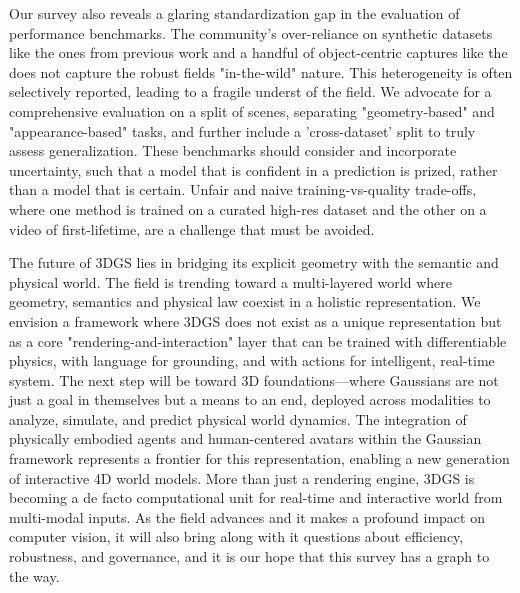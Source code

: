 \documentclass[11pt,a4paper]{article}
\begin{document}
Our survey also reveals a glaring standardization gap in the evaluation of performance benchmarks. The community's over-reliance on synthetic datasets like the ones from previous work \cite{arxiv:2112.05131v1,arxiv:2103.14024v2} and a handful of object-centric captures like the \cite{arxiv:2112.05131v1} does not capture the robust fields "in-the-wild" nature. This heterogeneity is often selectively reported, leading to a fragile underst of the field. We advocate for a comprehensive evaluation on a split of scenes, separating "geometry-based" and "appearance-based" tasks, and further include a 'cross-dataset' split to truly assess generalization. These benchmarks should consider and incorporate uncertainty, such that a model that is confident in a prediction is prized, rather than a model that is certain. Unfair and naive training-vs-quality trade-offs, where one method is trained on a curated high-res dataset and the other on a video of first-lifetime, are a challenge that must be avoided.

The future of 3DGS lies in bridging its explicit geometry with the semantic and physical world. The field is trending toward a multi-layered world where geometry, semantics \cite{arxiv:2312.00732v1} and physical law coexist in a holistic representation. We envision a framework where 3DGS does not exist as a unique representation but as a core "rendering-and-interaction" layer that can be trained with differentiable physics, with language for grounding, and with actions for intelligent, real-time system. The next step will be toward 3D foundations---where Gaussians are not just a goal in themselves but a means to an end, deployed across modalities to analyze, simulate, and predict physical world dynamics. The integration of physically embodied agents \cite{arxiv:2403.08498v1} and human-centered avatars \cite{arxiv:2403.05087v1} within the Gaussian framework represents a frontier for this representation, enabling a new generation of interactive 4D world models. More than just a rendering engine, 3DGS is becoming a de facto computational unit for real-time and interactive world from multi-modal inputs. As the field advances and it makes a profound impact on computer vision, it will also bring along with it questions about efficiency, robustness, and governance, and it is our hope that this survey has a graph to the way.
\end{document}
